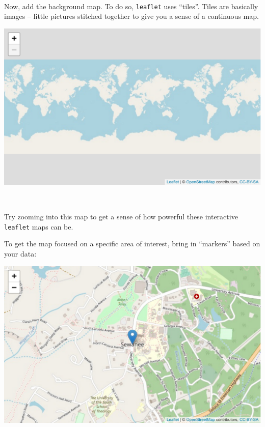 \documentclass[]{book}
\newenvironment{Shaded}{\begin{snugshade}}{\end{snugshade}}
\newcommand{\DataTypeTok}[1]{\textcolor[rgb]{0.13,0.29,0.53}{#1}}
\newcommand{\KeywordTok}[1]{\textcolor[rgb]{0.13,0.29,0.53}{\textbf{#1}}}
\newcommand{\NormalTok}[1]{#1}
\newcommand{\OperatorTok}[1]{\textcolor[rgb]{0.81,0.36,0.00}{\textbf{#1}}}
\newcommand{\StringTok}[1]{\textcolor[rgb]{0.31,0.60,0.02}{#1}}
\begin{document}
~

Now, add the background map. To do so, \texttt{leaflet} uses ``tiles''. Tiles are basically images -- little pictures stitched together to give you a sense of a continuous map.

\begin{Shaded}
\end{Shaded}

\includegraphics{figures/unnamed-chunk-387-1.pdf}

~

Try zooming into this map to get a sense of how powerful these interactive \texttt{leaflet} maps can be.

To get the map focused on a specific area of interest, bring in ``markers'' based on your data:

\begin{Shaded}
\end{Shaded}

\includegraphics{figures/unnamed-chunk-388-1.pdf}
\end{document}
